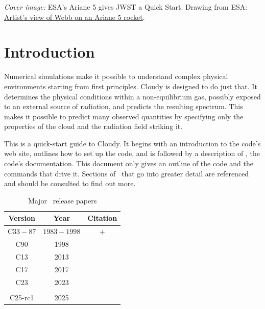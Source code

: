 \documentclass[12pt,twoside]{article}
\begin{document}
\clearpage

\vspace{5mm}
\noindent
{\small
{\em Cover image:}
ESA's Ariane 5 gives JWST a Quick Start. Drawing from ESA:
\href{https://www.esa.int/ESA_Multimedia/Images/2021/07/Artist_s_view_of_Webb_on_an_Ariane_5_rocket}{Artist's view of Webb on an Ariane 5 rocket}.
\clearpage

\setcounter{tocdepth}{2}
\tableofcontents

\clearpage

\section{Introduction}
\label{sec:Introduction}

Numerical simulations make it
possible to understand complex physical
environments starting from first principles.  Cloudy is designed to do just
that.  It determines the physical conditions within a non-equilibrium gas,
possibly exposed to an external source of radiation, and predicts the
resulting spectrum.  This makes it possible to predict many observed
quantities by specifying only the properties of the cloud and the radiation
field striking it.

This is a quick-start guide to Cloudy.  It begins with an introduction
to the code's web site, outlines how to set up the code, and is followed
by a description of \Hazy, the code's documentation.  This document only
gives an outline of the code and the commands that drive it.  Sections of
\Hazy\ that go into greater detail are referenced and should be consulted
to find out more.

\begin{table}
\vspace{-5mm}
\caption{\label{tab:CloudyReleasePapers} Major \Cloudy\ release papers}
\begin{tabular}{|c c c|}
\hline
Version & Year & Citation \\
\hline
C$33- 87$ & $1983-1998$ &  
\citet{1991hbic.book.....F,1993hbic.book.....F,1996hbic.book.....F}+\\
C90 & 1998 & \citet{ 1998PASP..110..761F} \\
C13 & 2013 &\citet{2013RMxAA..49..137F}\\
C17 & 2017 & \citet{CloudyRevista2017}\\
C23 & 2023 & \makecell{\citet{2023RMxAA..59..327C}\\\citet{gunasekera2023}}\\
C25-rc1 & 2025 & \citet{2024arXiv241201606G} \\
\hline
\end{tabular}
\end{table}

}
\end{document}
